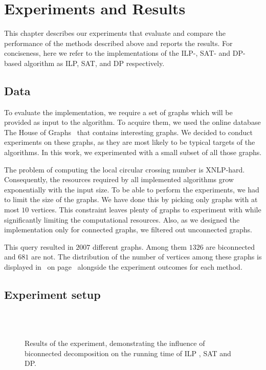 \chapter{Experiments and Results}\label{ch:experiments-and-results}

This chapter describes our experiments that evaluate and compare the performance of the methods described above and reports the results. For conciseness, here we refer to the implementations of the ILP-, SAT- and DP-based algorithm as \textsf{ILP}, \textsf{SAT}, and \textsf{DP} respectively.


\section{Data}

To evaluate the implementation, we require a set of graphs which will be provided as input to the algorithm. To acquire them, we used the online database The House of Graphs~\cite{HoG} that contains interesting graphs. We decided to conduct experiments on these graphs, as they are most likely to be typical targets of the algorithms. In this work, we experimented with a small subset of all those graphs.

The problem of computing the local circular crossing number is XNLP-hard. Consequently, the resources required by all implemented algorithms grow exponentially with the input size. To be able to perform the experiments, we had to limit the size of the graphs. We have done this by picking only graphs with at most \(10\) vertices. This constraint leaves plenty of graphs to experiment with while significantly limiting the computational resources. Also, as we designed the implementation only for connected graphs, we filtered out unconnected graphs.

This query resulted in \(2007\) different graphs. Among them \(1326\) are biconnected and \(681\) are not. The distribution of the number of vertices among these graphs is displayed in~ on page~\pageref{fig:vertex-dist} alongside the experiment outcomes for each method.


\section{Experiment setup}

\begin{figure}
    \centering
    \\[3em]
    \vfill
    \\[3em]
    \vfill
    \caption{Results of the experiment, demonstrating the influence of biconnected decomposition on the running time of \textsf{ILP} , \textsf{SAT} and \textsf{DP}.}
    \label{fig:bctree-results}
\end{figure}


